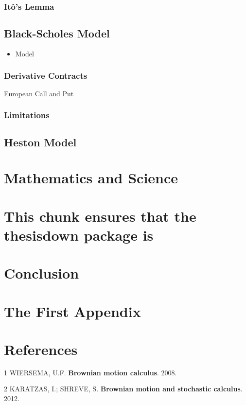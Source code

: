 \documentclass[12pt,twoside]{reedthesis}
\providecommand{\tightlist}{%
  \setlength{\itemsep}{0pt}\setlength{\parskip}{0pt}}
\theoremstyle{definition}
\theoremstyle{definition}
\theoremstyle{remark}
\begin{document}
  \subsection{Itô's Lemma}\label{itos-lemma}
  
  \section{Black-Scholes Model}\label{black-scholes-model}
  
  \begin{itemize}
  \tightlist
  \item
    Model
  \end{itemize}
  
  \subsection{Derivative Contracts}\label{derivative-contracts}
  
  European Call and Put
  
  \subsection{Limitations}\label{limitations}
  
  \section{Heston Model}\label{heston-model}
  
  \chapter{Mathematics and Science}\label{math-sci}
  
  \chapter{This chunk ensures that the thesisdown package
  is}\label{this-chunk-ensures-that-the-thesisdown-package-is}
  
  \chapter*{Conclusion}\label{conclusion}
  
  \chapter{The First Appendix}\label{the-first-appendix}
  
  \chapter*{References}\label{references}
  
  \hypertarget{refs}{}
  \hypertarget{ref-ubbo}{}
  1 WIERSEMA, U.F. \textbf{Brownian motion calculus}. 2008.
  
  \hypertarget{ref-karatzas2012brownian}{}
  2 KARATZAS, I.; SHREVE, S. \textbf{Brownian motion and stochastic
  calculus}. 2012.


\end{document}
